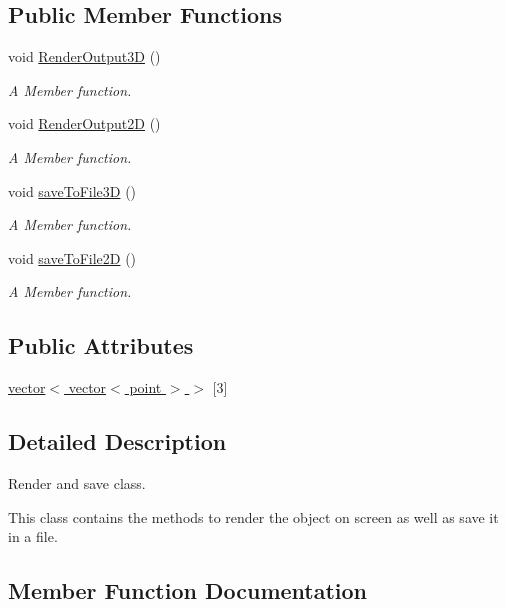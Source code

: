 \subsection*{Public Member Functions}
\begin{DoxyCompactItemize}
\item 
void \hyperlink{classOutput_a50c6da843dbf27d6238ed07082b31839}{Render\+Output3D} ()
\begin{DoxyCompactList}\small\item\em A Member function. \end{DoxyCompactList}\item 
void \hyperlink{classOutput_a9766c258cad838c5779e0abc778a530d}{Render\+Output2D} ()
\begin{DoxyCompactList}\small\item\em A Member function. \end{DoxyCompactList}\item 
void \hyperlink{classOutput_aa16a2893d743f7c218c026efa3e65718}{save\+To\+File3D} ()
\begin{DoxyCompactList}\small\item\em A Member function. \end{DoxyCompactList}\item 
void \hyperlink{classOutput_aa9ea0df4774ce32a319bdb1b3a6712a8}{save\+To\+File2D} ()
\begin{DoxyCompactList}\small\item\em A Member function. \end{DoxyCompactList}\end{DoxyCompactItemize}
\subsection*{Public Attributes}
\begin{DoxyCompactItemize}
\item 
\hyperlink{classOutput_a108ca6c08cfc8a442fac5f1dc864a481}{vector$<$ vector$<$ point $>$ $>$} \mbox{[}3\mbox{]}
\end{DoxyCompactItemize}


\subsection{Detailed Description}
Render and save class. 

This class contains the methods to render the object on screen as well as save it in a file. 

\subsection{Member Function Documentation}
